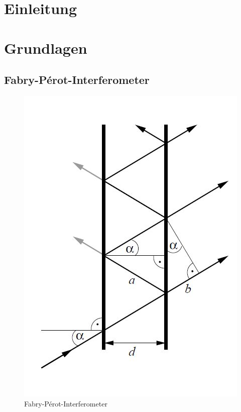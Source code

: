 

\maketitle

\tableofcontents


\chapter{Einleitung}

\chapter{Grundlagen}


\section{Fabry-Pérot-Interferometer}

\begin{figure}%
\includegraphics[scale=0.35]{img/Fabry}

\caption{Fabry-Pérot-Interferometer}
\end{figure}%

